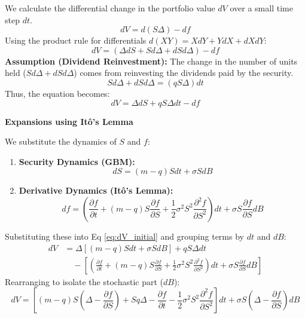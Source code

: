 We calculate the differential change in the portfolio value \(dV\) over a small time step \(dt\).
\begin{equation*}
    dV = d(S\Delta) - df
\end{equation*}
Using the product rule for differentials \(d(XY) = XdY + YdX + dXdY\):
\begin{equation*}
    dV = (\Delta dS + S d\Delta + dS d\Delta) - df
\end{equation*}
\textbf{Assumption (Dividend Reinvestment):} The change in the number of units held (\(S d\Delta + dS d\Delta\)) comes from reinvesting the dividends paid by the security.
\begin{equation*}
    S d\Delta + dS d\Delta = (q S \Delta) dt
\end{equation*}
Thus, the equation becomes:
\begin{equation} \label{eq:dV_initial}
    dV = \Delta dS + q S \Delta dt - df
\end{equation}

\textbf{Expansions using Itô's Lemma}

We substitute the dynamics of \(S\) and \(f\):
\begin{enumerate}
    \item \textbf{Security Dynamics (GBM):}
    \begin{equation*}
        dS = (m-q)S dt + \sigma S dB
    \end{equation*}
    \item \textbf{Derivative Dynamics (Itô's Lemma):}
    \begin{equation*}
        df = \left( \frac{\partial f}{\partial t} + (m-q)S \frac{\partial f}{\partial S} + \frac{1}{2}\sigma^2 S^2 \frac{\partial^2 f}{\partial S^2} \right) dt + \sigma S \frac{\partial f}{\partial S} dB
    \end{equation*}
\end{enumerate}

\noindent Substituting these into Eq \eqref{eq:dV_initial} and grouping terms by \(dt\) and \(dB\):
\begin{align*}
    dV &= \Delta [(m-q)S dt + \sigma S dB] + qS\Delta dt \\
       &\quad - \left[ \left( \frac{\partial f}{\partial t} + (m-q)S \frac{\partial f}{\partial S} + \frac{1}{2}\sigma^2 S^2 \frac{\partial^2 f}{\partial S^2} \right) dt + \sigma S \frac{\partial f}{\partial S} dB \right]
\end{align*}
Rearranging to isolate the stochastic part (\(dB\)):
\begin{equation*}
    dV = \left[ (m-q)S\left(\Delta - \frac{\partial f}{\partial S}\right) + Sq\Delta - \frac{\partial f}{\partial t} - \frac{1}{2}\sigma^2 S^2 \frac{\partial^2 f}{\partial S^2} \right] dt + \sigma S \left( \Delta - \frac{\partial f}{\partial S} \right) dB
\end{equation*}

